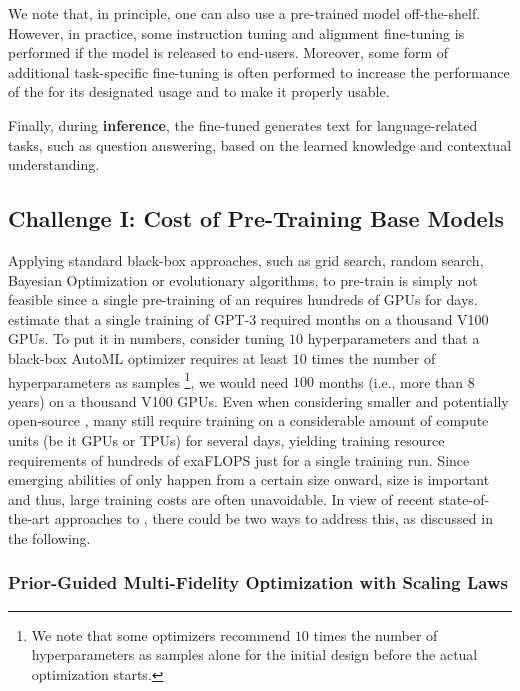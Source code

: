 \documentclass[10pt]{article} %
\begin{document}
We note that, in principle, one can also use a pre-trained model off-the-shelf. However, in practice, some instruction tuning and alignment fine-tuning is performed if the model is released to end-users. Moreover, some form of additional task-specific fine-tuning is often performed to increase the performance of the \LLM for its designated usage and to make it properly usable.

Finally, during \textbf{inference}, the fine-tuned \LLM generates text for language-related tasks, such as question answering, based on the learned knowledge and contextual understanding.

\subsection{Challenge I: Cost of Pre-Training Base Models}

Applying standard black-box \AutoML approaches, such as grid search, random search, Bayesian Optimization or evolutionary algorithms, to pre-train \LLMs is simply not feasible since a single pre-training of an \LLM requires hundreds of GPUs for days. \cite{brown-neurips20a} estimate that a single training of GPT-3 required months on a thousand V100 GPUs. To put it in numbers, consider tuning $10$ hyperparameters and that a black-box AutoML optimizer requires at least $10$ times the number of hyperparameters as samples \footnote{We note that some optimizers recommend $10$ times the number of hyperparameters as samples alone for the initial design before the actual optimization starts.}, we would need $100$ months (i.e., more than 8 years) on a thousand V100 GPUs. Even when considering smaller and potentially open-source \LLMs, many still require training on a considerable amount of compute units (be it GPUs or TPUs) for several days, yielding training resource requirements of hundreds of exaFLOPS \citep{geiping-icml23a} just for a single training run. Since emerging abilities of \LLMs only happen from a certain size onward, size is important and thus, large training costs are often unavoidable. In view of recent state-of-the-art approaches to \AutoML, there could be two ways to address this, as discussed in the following.

\subsubsection{Prior-Guided Multi-Fidelity Optimization with Scaling Laws}
\end{document}
